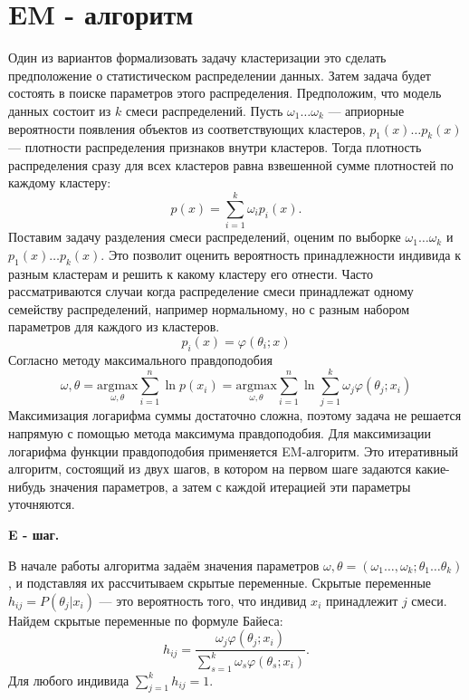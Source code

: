 \documentclass[10pt]{article}
\begin{document}
\section{EM - алгоритм}

Один из вариантов формализовать задачу кластеризации это сделать предположение о статистическом распределении данных. Затем задача будет состоять в поиске параметров этого распределения. Предположим, что модель данных состоит из $k$ смеси распределений. Пусть $\omega_{1}\ldots \omega_{k}$ --- априорные вероятности появления объектов из соответствующих кластеров, $p_{1}(x)\ldots p_{k}(x)$ --- плотности распределения признаков внутри кластеров. Тогда плотность распределения сразу для всех кластеров равна взвешенной сумме плотностей по каждому кластеру:
\begin{equation}
p(x) = \sum\limits_{i=1}^k \omega_{i} p_{i}(x).
\end{equation}
Поставим задачу разделения смеси распределений, оценим по выборке $\omega_{1}\ldots \omega_{k}$ и $p_{1}(x)\ldots p_{k}(x)$. Это позволит оценить вероятность принадлежности индивида к разным кластерам и решить к какому кластеру его отнести. Часто рассматриваются случаи когда распределение смеси принадлежат одному семейству распределений, например нормальному, но с разным набором параметров для каждого из кластеров. 
\begin{equation}
p_{i}(x) = \varphi(\theta_{i}; x)
\end{equation}
Согласно методу максимального правдоподобия 
\begin{equation}\label{maxlog} 
\omega, \theta = \underset{\omega, \theta}{\text{argmax}} \sum\limits_{i=1}^n \ln{p(x_{i})}  =  \underset{\omega, \theta}{\text{argmax}} \sum\limits_{i=1}^n \ln  \sum\limits_{j=1}^k \omega_{j}  \varphi(\theta_{j}; x_{i})
\end{equation}
Максимизация логарифма суммы достаточно сложна, поэтому задача не решается напрямую с помощью метода максимума правдоподобия. Для максимизации логарифма функции правдоподобия применяется EM-алгоритм. Это итеративный алгоритм, состоящий из двух шагов, в котором на первом шаге задаются какие-нибудь значения параметров, а затем с каждой итерацией эти параметры уточняются.

\textbf{E - шаг.}

В начале работы алгоритма задаём значения параметров $\omega, \theta = (\omega_{1}\ldots, \omega_{k};\theta_{1}\ldots \theta_{k})$, и подставляя их рассчитываем скрытые переменные. Скрытые переменные $h_{ij} = P(\theta_{j}|x_{i})$ --- это вероятность того, что индивид $x_{i}$ принадлежит $j$ смеси. Найдем скрытые переменные по формуле Байеса:
\begin{equation}
h_{ij} = \frac{ \omega_{j} \varphi(\theta_{j}; x_{i})}{\sum\limits_{s=1}^k \omega_{s}  \varphi(\theta_{s}; x_{i})}.
\end{equation}
Для любого индивида $\sum\limits_{j=1}^k h_{ij} = 1.$
\end{document}
